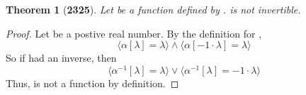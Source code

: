 \documentclass[preview]{standalone}
\newtheorem*{theorem*}{Theorem}
\begin{document}
\begin{theorem*}[\textbf{2325}]
    Let \bm{$\alpha$} be a function 
    defined by \bm{$\alpha[\lambda] = |\lambda|$}. 
    \bm{$\alpha[\lambda]$} is not invertible.
\end{theorem*}

\begin{proof}
    Let \bm{$\lambda$} be a postive real number. 
    By the definition for \bm{$\alpha$}, 
    \begin{equation*}
        \Big \langle \alpha[\lambda] = \lambda \Big \rangle
            \land
        \Big \langle \alpha[-1 \cdot \lambda] = \lambda \Big \rangle
    \end{equation*}
    So if \bm{$\alpha$} had an inverse, then
    \begin{equation*}
        \Big \langle \alpha ^{-1}[\lambda] = \lambda \Big \rangle
            \lor 
        \Big \langle \alpha ^{-1}[\lambda] = -1 \cdot \lambda \Big \rangle
    \end{equation*}
    Thus,  is not a function by definition.
\color{lightgray} \end{proof}
\end{document}
